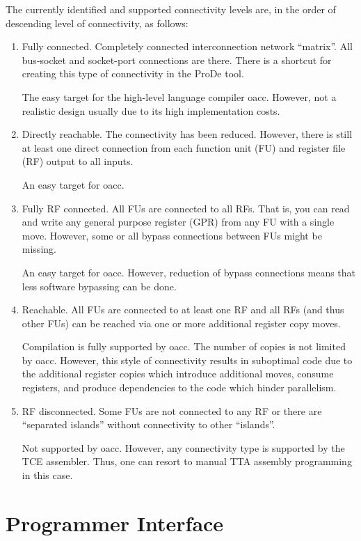 \documentclass[a4paper,twoside]{tceusermanual}
\begin{document}
The currently identified and supported connectivity levels are, in the order of 
descending level of connectivity, as follows:
\begin{enumerate}

\item Fully connected. Completely connected interconnection network ``matrix''.
All bus-socket and socket-port connections are there. There is a shortcut for
creating this type of connectivity in the ProDe tool.

The easy target for the high-level language compiler oacc. However, not
a realistic design usually due to its high implementation costs.

\item Directly reachable. The connectivity has been reduced. However, there is
still at least one direct connection from each function unit (FU) and register file 
(RF) output to all inputs.

An easy target for oacc.

\item Fully RF connected. All FUs are connected to all RFs. That is, you can 
read and write any general purpose register (GPR) from any FU with a single
move. However, some or all bypass connections between FUs might be missing.

An easy target for oacc. However, reduction of bypass connections means
that less software bypassing can be done.

\item Reachable. All FUs are connected to at least one RF and all RFs (and thus
other FUs) can be reached via one or more additional register copy moves. 

Compilation is fully supported by oacc. The number of copies is not 
limited by oacc. However, this style of connectivity results in suboptimal code due to the
additional register copies which introduce additional moves, consume registers, and
produce dependencies to the code which hinder parallelism.

\item RF disconnected. Some FUs are not connected to any RF or there are 
``separated islands'' without connectivity to other ``islands''.

Not supported by oacc. However, any connectivity type is supported by 
the TCE assembler. Thus, one can resort to manual TTA assembly programming in
this case.

\end{enumerate}

\section{Programmer Interface}
\end{document}
